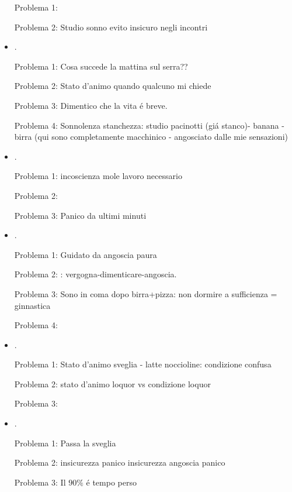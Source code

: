 \begin{itemize}
Problema 1: 

Problema 2: Studio sonno evito insicuro negli incontri

\item {}.

Problema 1: Cosa succede la mattina sul serra??

Problema 2: Stato d'animo quando qualcuno mi chiede

Problema 3: Dimentico che la vita \'e breve.

Problema 4: Sonnolenza stanchezza: studio pacinotti (gi\'a stanco)- banana - birra (qui sono completamente macchinico - angosciato dalle mie sensazioni)

\item {}.

Problema 1: incoscienza mole lavoro necessario

Problema 2: 

Problema 3: Panico da ultimi minuti

\item {}.

Problema 1: Guidato da angoscia paura

Problema 2: : vergogna-dimenticare-angoscia.

Problema 3: Sono in coma dopo birra+pizza: non dormire a sufficienza = ginnastica

Problema 4: 

\item {}.

Problema 1: Stato d'animo sveglia - latte noccioline: condizione confusa

Problema 2: stato d'animo loquor vs condizione loquor

Problema 3: 

\item {}.

Problema 1: Passa la sveglia

Problema 2: insicurezza panico insicurezza angoscia panico

Problema 3: Il $90\%$ \'e tempo perso


\end{itemize}

